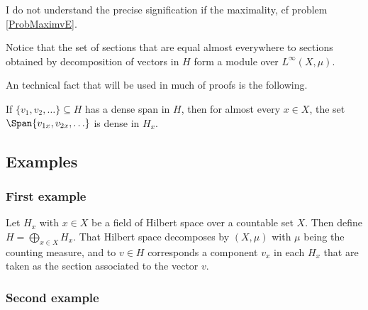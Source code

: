 \begin{probleme}
I do not understand the precise signification if the maximality, cf problem \ref{ProbMaximvE}.
\end{probleme}

Notice that the set of sections that are equal almost everywhere to sections obtained by decomposition of vectors in $H$ form a module over $L^{\infty}(X,\mu)$.


An technical fact that will be used in much of proofs is the following. 

\begin{lemma}		\label{LemdensHdensHx}
If $\{ v_1,v_2,\ldots \}\subseteq H$ has a dense span in $H$, then for almost every $x\in X$, the set $\Span\{ v_{1x},v_{2x},\ldots \}$ is dense in $H_x$.
\end{lemma}

					\subsection{Examples}

					\subsubsection{First example}



Let $H_x$ with $x\in X$ be a field of Hilbert space over a countable set $X$. Then define $H=\bigoplus_{x\in X}H_x$. That Hilbert space decomposes by $(X,\mu)$ with $\mu$ being the counting measure, and to $v\in H$ corresponds a component $v_x$ in each $H_x$ that are taken as the section associated to the vector $v$.

					\subsubsection{Second example}


